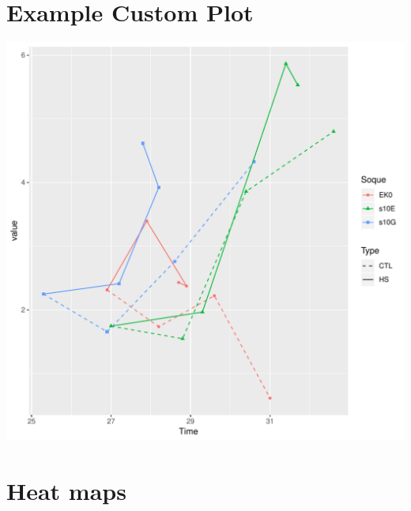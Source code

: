 \documentclass{article}\usepackage[]{graphicx}\usepackage[]{color}
\newenvironment{knitrout}{}{} %
\begin{document}
\section{Example Custom Plot}
\begin{knitrout}
\color{fgcolor}

{\centering \includegraphics[width=1\linewidth]{figure/minimal-custom_plots-1} 

}



\end{knitrout}
\clearpage





\section{Heat maps}
\end{document}
